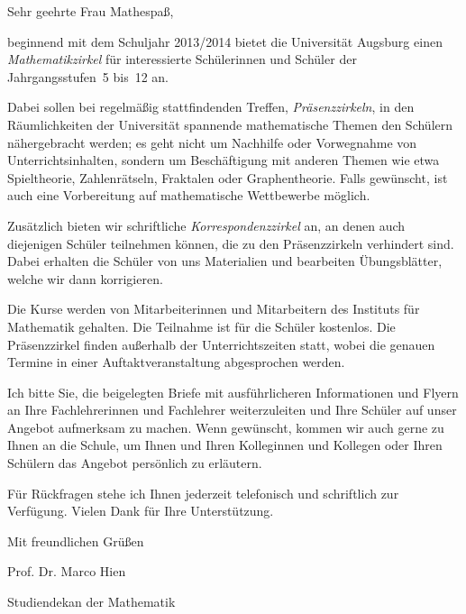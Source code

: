 \documentclass{zirkelbrief}
\begin{document}
\renewcommand{\anschrift}{%
      Holbein-Gymnasium Augsburg \\
      Fachbereich Mathematik \\
      Hallstraße 10 \\
      86150 Augsburg}
\renewcommand{\datum}{2.9.2013}
\renewcommand{\betreff}{Matheschülerzirkel der Universität Augsburg}

\makeletterhead

Sehr geehrte Frau Mathespaß,

beginnend mit dem Schuljahr 2013/2014 bietet die Universität Augsburg
einen \emph{Mathe\-matik\-zir\-kel} für interessierte Schülerinnen und Schüler der
Jahrgangsstufen~5 bis~12 an.

Dabei sollen bei regelmäßig stattfindenden Treffen, \emph{Präsenzzirkeln}, in
den Räum\-lich\-kei\-ten der Universität spannende mathematische Themen den Schülern
nähergebracht werden; es geht nicht um Nachhilfe oder Vorwegnahme von
Unterrichtsinhalten, sondern um Beschäftigung mit anderen Themen wie etwa
Spieltheorie, Zahlenrätseln, Fraktalen oder Graphentheorie. Falls gewünscht, ist
auch eine Vorbereitung auf mathematische Wettbewerbe möglich.

Zusätzlich bieten wir schriftliche \emph{Korrespondenzzirkel} an, an denen auch diejenigen Schüler teilnehmen können, die zu den Präsenzzirkeln verhindert sind. Dabei erhalten die Schüler von uns
Materialien und bearbeiten Übungsblätter, welche wir dann korrigieren.

Die Kurse werden von Mitarbeiterinnen und Mitarbeitern des
Instituts für Mathematik gehalten. Die Teilnahme ist für die Schüler kostenlos. Die Präsenzzirkel finden
außerhalb der Unterrichtszeiten statt, wobei die genauen Termine in einer
Auftaktveranstaltung abgesprochen werden.

Ich bitte Sie, die beigelegten Briefe mit ausführlicheren Informationen und Flyern an Ihre
Fachlehrerinnen und Fachlehrer weiterzuleiten und Ihre Schüler auf unser
Angebot aufmerksam zu machen. Wenn gewünscht, kommen wir auch gerne zu Ihnen an die
Schule, um Ihnen und Ihren Kolleginnen und Kollegen oder Ihren Schülern das
Angebot persönlich zu erläutern.

Für Rückfragen stehe ich Ihnen jederzeit telefonisch und schriftlich 
zur Verfügung. Vielen Dank für Ihre Unterstützung.

Mit freundlichen Grüßen

\vspace{1cm}

Prof. Dr. Marco Hien

\vspace{-0.2cm}

{\small Studiendekan der Mathematik}
\end{document}
